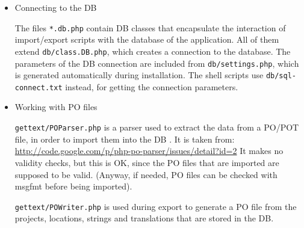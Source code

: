 \documentclass[11pt]{article}
\begin{document}
\begin{itemize}

\item Connecting to the DB\\
\label{sec-8.4.5.1}


     The files \texttt{*.db.php} contain DB classes that encapsulate the
     interaction of import/export scripts with the database of the
     application. All of them extend \texttt{db/class.DB.php}, which creates a
     connection to the database. The parameters of the DB connection are
     included from \texttt{db/settings.php}, which is generated automatically
     during installation.  The shell scripts use \texttt{db/sql-connect.txt}
     instead, for getting the connection parameters.


\item Working with PO files\\
\label{sec-8.4.5.2}


     \texttt{gettext/POParser.php} is a parser used to extract the data from a
     PO/POT file, in order to import them into the DB . It is taken from:
     \href{http://code.google.com/p/php-po-parser/issues/detail?id=2}{http://code.google.com/p/php-po-parser/issues/detail?id=2} It makes
     no validity checks, but this is OK, since the PO files that are
     imported are supposed to be valid. (Anyway, if needed, PO files can
     be checked with msgfmt before being imported).

     \texttt{gettext/POWriter.php} is used during export to generate a PO file
     from the projects, locations, strings and translations that are
     stored in the DB.



\end{itemize} %
\end{document}
